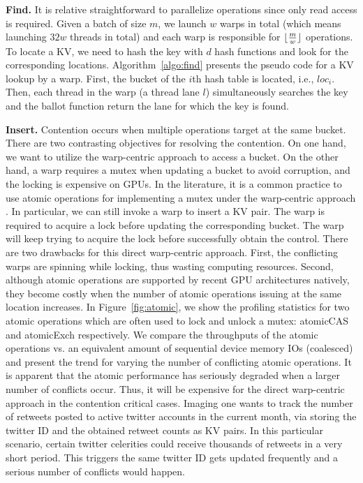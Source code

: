 \vspace{1mm}\noindent\textbf{Find.} It is relative straightforward to parallelize  operations since only read access is required. 
Given a batch of size $m$, we launch $w$ warps in total (which means launching $32w$ threads in total) and each warp is responsible for $\lfloor\frac{m}{w}\rfloor$  operations. To locate a KV, we need to hash the key with $d$ hash functions and look for the corresponding locations. 
Algorithm~\ref{algo:find} presents the pseudo code for a KV lookup by a warp. 
First, the bucket of the $i$th hash table is located, i.e., $loc_i$.
Then, each thread in the warp (a thread lane $l$) simultaneously searches the key and the ballot function return the lane for which the key is found.




\vspace{1mm}\noindent\textbf{Insert.} Contention occurs when multiple  operations target at the same bucket. 
There are two contrasting objectives for resolving the contention. On one hand, we want to utilize the warp-centric approach to access a bucket.
On the other hand, a warp requires a mutex when updating a bucket to avoid corruption, and the locking is expensive on GPUs.  
In the literature, it is a common practice to use atomic operations for implementing a mutex under the warp-centric approach \cite{zhang2015mega}. 
In particular, we can still invoke a warp to insert a KV pair. The warp is required to acquire a lock before updating the corresponding bucket. 
The warp will keep trying to acquire the lock before successfully obtain the control. 
There are two drawbacks for this direct warp-centric approach. 
First, the conflicting warps are spinning while locking, thus wasting computing resources.
Second, although atomic operations are supported by recent GPU architectures natively, 
they become costly when the number of atomic operations issuing at the same location increases. 
In Figure~\ref{fig:atomic}, we show the profiling statistics for two atomic operations which are often used to lock and unlock a mutex: atomicCAS and atomicExch respectively. 
We compare the throughputs of the atomic operations vs. an equivalent amount of sequential device memory IOs (coalesced) and present the trend for varying the number of conflicting atomic operations. It is apparent that the atomic performance has seriously degraded when a larger number of conflicts occur. 
Thus, it will be expensive for the direct warp-centric approach in the contention critical cases. 
Imaging one wants to track the number of retweets posted to active twitter accounts in the current month, via storing the twitter ID and the obtained retweet counts as KV pairs. In this particular scenario, certain twitter celerities could receive thousands of retweets in a very short period. 
This triggers the same twitter ID gets updated frequently and a serious number of conflicts would happen. 


